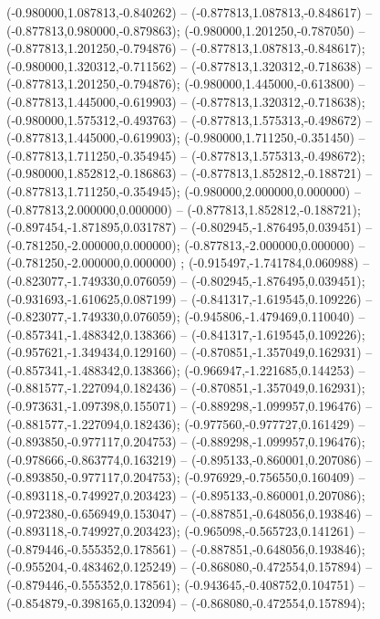  (-0.980000,1.087813,-0.840262) -- (-0.877813,1.087813,-0.848617) -- (-0.877813,0.980000,-0.879863);
 (-0.980000,1.201250,-0.787050) -- (-0.877813,1.201250,-0.794876) -- (-0.877813,1.087813,-0.848617);
 (-0.980000,1.320312,-0.711562) -- (-0.877813,1.320312,-0.718638) -- (-0.877813,1.201250,-0.794876);
 (-0.980000,1.445000,-0.613800) -- (-0.877813,1.445000,-0.619903) -- (-0.877813,1.320312,-0.718638);
 (-0.980000,1.575312,-0.493763) -- (-0.877813,1.575313,-0.498672) -- (-0.877813,1.445000,-0.619903);
 (-0.980000,1.711250,-0.351450) -- (-0.877813,1.711250,-0.354945) -- (-0.877813,1.575313,-0.498672);
 (-0.980000,1.852812,-0.186863) -- (-0.877813,1.852812,-0.188721) -- (-0.877813,1.711250,-0.354945);
 (-0.980000,2.000000,0.000000) -- (-0.877813,2.000000,0.000000) -- (-0.877813,1.852812,-0.188721);
 (-0.897454,-1.871895,0.031787) -- (-0.802945,-1.876495,0.039451) -- (-0.781250,-2.000000,0.000000);
 (-0.877813,-2.000000,0.000000) -- (-0.781250,-2.000000,0.000000) ;
 (-0.915497,-1.741784,0.060988) -- (-0.823077,-1.749330,0.076059) -- (-0.802945,-1.876495,0.039451);
 (-0.931693,-1.610625,0.087199) -- (-0.841317,-1.619545,0.109226) -- (-0.823077,-1.749330,0.076059);
 (-0.945806,-1.479469,0.110040) -- (-0.857341,-1.488342,0.138366) -- (-0.841317,-1.619545,0.109226);
 (-0.957621,-1.349434,0.129160) -- (-0.870851,-1.357049,0.162931) -- (-0.857341,-1.488342,0.138366);
 (-0.966947,-1.221685,0.144253) -- (-0.881577,-1.227094,0.182436) -- (-0.870851,-1.357049,0.162931);
 (-0.973631,-1.097398,0.155071) -- (-0.889298,-1.099957,0.196476) -- (-0.881577,-1.227094,0.182436);
 (-0.977560,-0.977727,0.161429) -- (-0.893850,-0.977117,0.204753) -- (-0.889298,-1.099957,0.196476);
 (-0.978666,-0.863774,0.163219) -- (-0.895133,-0.860001,0.207086) -- (-0.893850,-0.977117,0.204753);
 (-0.976929,-0.756550,0.160409) -- (-0.893118,-0.749927,0.203423) -- (-0.895133,-0.860001,0.207086);
 (-0.972380,-0.656949,0.153047) -- (-0.887851,-0.648056,0.193846) -- (-0.893118,-0.749927,0.203423);
 (-0.965098,-0.565723,0.141261) -- (-0.879446,-0.555352,0.178561) -- (-0.887851,-0.648056,0.193846);
 (-0.955204,-0.483462,0.125249) -- (-0.868080,-0.472554,0.157894) -- (-0.879446,-0.555352,0.178561);
 (-0.943645,-0.408752,0.104751) -- (-0.854879,-0.398165,0.132094) -- (-0.868080,-0.472554,0.157894);
